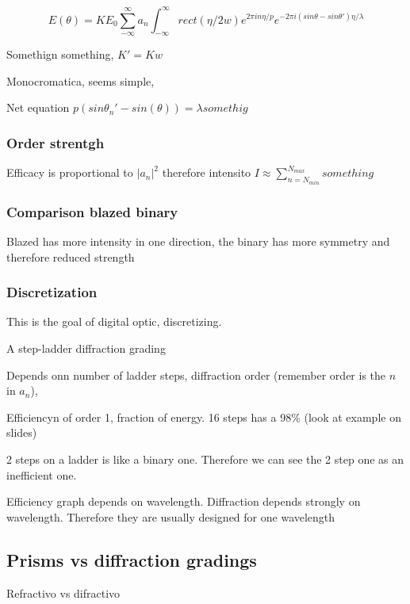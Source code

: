 \documentclass[../main/main.tex]{subfiles}
\begin{document}
\begin{equation}
E(\theta) = K E_{0}\sum_{-\infty}^{\infty} a_{n} \int_{-\infty}^{\infty} rect(\eta/2w) e^{2\pi i n \eta / p}e^{-2 \pi i (sin \theta - sin \theta') \eta/\lambda}
\end{equation}

Somethign something, $K' = Kw$

Monocromatica, seems simple, 

Net equation $p (sin \theta_{n}' - sin(\theta)) = \lambda somethig$

\subsubsection{Order strentgh}

Efficacy is proportional to $|a_{n}|^{2}$ therefore intensito $I \approx \sum_{n=N_{min}}^{N_{max}} something$


\subsubsection{Comparison blazed binary}

Blazed has more intensity in one direction, the binary has more symmetry and therefore reduced strength

\subsubsection{Discretization}

This is the goal of digital optic, discretizing. 

A step-ladder diffraction grading

Depends onn number of ladder steps, diffraction order (remember order is the $n$ in $a_{n}$),  

Efficiencyn of order 1, fraction of energy. 16 steps has a 98\% (look at example on slides)

2 steps on a ladder is like a binary one. Therefore we can see the 2 step one as an inefficient one.


Efficiency graph depends on wavelength. Diffraction depends strongly on wavelength. Therefore they are usually designed for one wavelength


\subsection{Prisms vs diffraction gradings}

Refractivo vs difractivo
\end{document}

